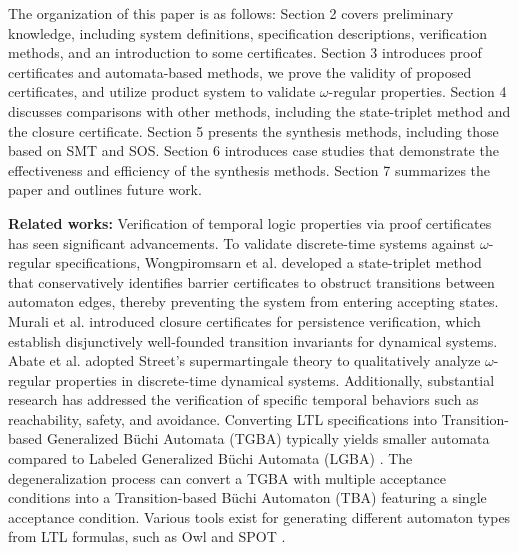 \documentclass[acmlarge]{acmart}
\begin{document}

The organization of this paper is as follows: Section 2 covers preliminary knowledge, including system definitions, specification descriptions, verification methods, and an introduction to some certificates. Section 3 introduces proof certificates and automata-based methods, we prove the validity of proposed certificates, and utilize product system to validate $\omega$-regular properties. Section 4 discusses comparisons with other methods, including the state-triplet method and the closure certificate. Section 5 presents the synthesis methods, including those based on SMT and SOS.  Section 6 introduces case studies that demonstrate the effectiveness and efficiency of the synthesis methods. Section 7 summarizes the paper and outlines future work.


\textbf{Related works: } Verification of temporal logic properties via proof certificates has seen significant advancements. To validate discrete-time systems against $\omega$-regular specifications, Wongpiromsarn et al.\cite{wongpiromsarn2015automata} developed a state-triplet method that conservatively identifies barrier certificates \cite{prajna2007framework} to obstruct transitions between automaton edges, thereby preventing the system from entering accepting states. Murali et al.\cite{murali2024closure} introduced closure certificates for persistence verification, which establish disjunctively well-founded transition invariants \cite{podelski2004transition} for dynamical systems. Abate et al.\cite{abate2024stochastic} adopted Street's supermartingale theory to qualitatively analyze $\omega$-regular properties in discrete-time dynamical systems. Additionally, substantial research has addressed the verification of specific temporal behaviors such as reachability, safety, and avoidance\cite{chakarov2013probabilistic,chatterjee2016algorithmic,chatterjee2024sound,chatterjee2024equivalence}. Converting LTL specifications into Transition-based Generalized Büchi Automata (TGBA) typically yields smaller automata compared to Labeled Generalized Büchi Automata (LGBA) \cite{couvreur1999fly}. The degeneralization process \cite{giannakopoulou2002states} can convert a TGBA with multiple acceptance conditions into a Transition-based Büchi Automaton (TBA) featuring a single acceptance condition. Various tools exist for generating different automaton types from LTL formulas, such as Owl \cite{owl} and SPOT \cite{spot}.
\end{document}
